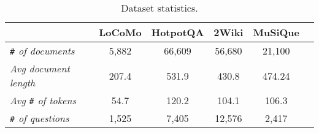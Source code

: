 \begin{table}[h]
    \centering
    \small{
        \begin{tabular}{lccccc}
            \toprule
            & {\textbf{LoCoMo}} & {\textbf{HotpotQA}} &{\textbf{2Wiki}} & {\textbf{MuSiQue}} \\
            \midrule
            \scriptsize \textit{\texttt{\#} of documents} & 5,882 & 66,609 & 56,680 & 21,100 \\
            \scriptsize \textit{Avg document length} & 207.4 & 531.9 & 430.8 & 474.24 \\
            \scriptsize \textit{Avg \texttt{\#} of tokens} & 54.7 & 120.2 & 104.1 & 106.3 \\
            \midrule
            \scriptsize \textit{\texttt{\#} of questions} & 1,525 & 7,405 & 12,576 & 2,417 \\
            \bottomrule
        \end{tabular}
    }
    \caption{\small Dataset statistics.}
    \label{tab:dataset_stats}
\end{table}